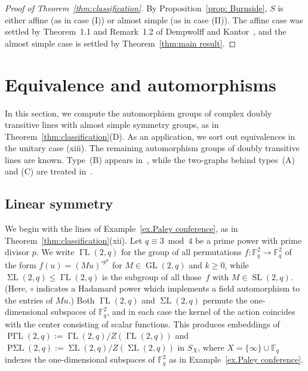 \documentclass[11pt]{article}
\theoremstyle{definition}
\numberwithin{equation}{section}
\begin{document}
\begin{proof}[Proof of Theorem~\ref{thm:classification}]
By Proposition~\ref{prop: Burnside}, $S$ is either affine (as in case (I)) or almost simple (as in case (II)).
The affine case was settled by Theorem~1.1 and Remark~1.2 of Dempwolff and Kantor~\cite{DempwolffK:23}, and the almost simple case is settled by Theorem~\ref{thm:main result}.
\end{proof}




\section{Equivalence and automorphisms}
\label{sec: equivalence}
In this section, we compute the automorphism groups of complex doubly transitive lines with almost simple symmetry groups, as in Theorem~\ref{thm:classification}(D).
As an application, we sort out equivalences in the unitary case (xiii).
The remaining automorphism groups of doubly transitive lines are known.
Type~(B) appears in~\cite{DempwolffK:23}, while the two-graphs behind types~(A) and (C) are treated in~\cite{Taylor:92}.


\subsection{Linear symmetry}
We begin with the lines of Example~\ref{ex.Paley conference}, as in Theorem~\ref{thm:classification}(xii).
Let $q\equiv 3 \bmod 4$ be a prime power with prime divisor $p$.
We write $\operatorname{\text{$\Gamma$}L}(2,q)$ for the group of all permutations $f\colon \mathbb{F}_q^2 \to \mathbb{F}_q^2$ of the form $f(u) = (Mu)^{\circ p^k}$ for $M \in \operatorname{GL}(2,q)$ and $k \geq 0$, while $\operatorname{\text{$\Sigma$}L}(2,q) \leq \operatorname{\text{$\Gamma$}L}(2,q)$ is the subgroup of all those~$f$ with $M \in \operatorname{SL}(2,q)$.
(Here, $\circ$ indicates a Hadamard power which implements a field automorphism to the entries of $Mu$.)
Both $\operatorname{\text{$\Gamma$}L}(2,q)$ and $\operatorname{\text{$\Sigma$}L}(2,q)$ permute the one-dimensional subspaces of $\mathbb{F}_q^2$, and in each case the kernel of the action coincides with the center consisting of scalar functions.
This produces embeddings of $\operatorname{P\text{$\Gamma$}L}(2,q):= \operatorname{\text{$\Gamma$}L}(2,q) / Z(\operatorname{\text{$\Gamma$}L}(2,q))$ and $\operatorname{P\text{$\Sigma$}L}(2,q):= \operatorname{\text{$\Sigma$}L}(2,q) / Z(\operatorname{\text{$\Sigma$}L}(2,q))$ in $S_X$, where $X= \{\infty\} \cup \mathbb{F}_q$ indexes the one-dimensional subspaces of $\mathbb{F}_q^2$ as in Example~\ref{ex.Paley conference}.
\end{document}
